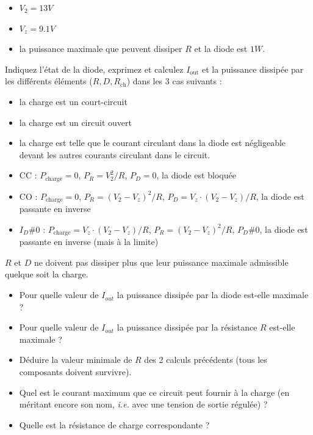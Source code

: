 \documentclass{../template/labo}
\begin{document}
\begin{itemize}
\item $V_2 = 13V$
\item $V_z = 9.1V$
\item la puissance maximale que peuvent dissiper $R$ et la diode est $1W$.
\end{itemize}
\Question
{
	Indiquez l'état de la diode, exprimez et calculez $I_{\mbox{out}}$ et la puissance dissipée par les différents éléments ($R, D, R_{\mbox{ch}}$) dans les 3 cas suivants :
	\begin{itemize}
	\item la charge est un court-circuit
	\item la charge est un circuit ouvert
	\item la charge est telle que le courant circulant dans la diode est négligeable devant les autres courants circulant dans le circuit.
	\end{itemize}
}
{
	\begin{itemize}
		\item CC : $P_{\mbox{charge}}=0$, $P_R=V_2^2/R$, $P_D=0$, la diode est bloquée
		\item CO :  $P_{\mbox{charge}}=0$, $P_R=\left(V_2-V_z\right)^2/R$, $P_D=V_z\cdot \left(V_2-V_z\right)/R$, la diode est passante en inverse
		\item $I_D\#0$ : $P_{\mbox{charge}}=V_z\cdot \left(V_2-V_z\right)/R$, $P_R=\left(V_2-V_z\right)^2/R$, $P_D\#0$, la diode est passante en inverse (mais à la limite)
		\end{itemize}	
	}%
	\label{Q:22}

\Question
{
	$R$ et $D$ ne doivent pas dissiper plus que leur puissance maximale admissible quelque soit la charge. %
	\begin{itemize}
	\item Pour quelle valeur de $I_{out}$ la puissance dissipée par la diode est-elle maximale ?
	\item Pour quelle valeur de $I_{out}$ la puissance dissipée par la résistance $R$ est-elle maximale ? 
	\item Déduire la valeur minimale de $R$ des 2 calculs précédents (tous les composants doivent survivre).
	\item Quel est le courant maximum que ce circuit peut fournir à la charge (en méritant encore son nom, \textit{i.e.} avec une tension de sortie régulée) ?
	\item Quelle est la résistance de charge correspondante ?
	\end{itemize}
}
{}%
	\label{Q:23}
\end{document}
